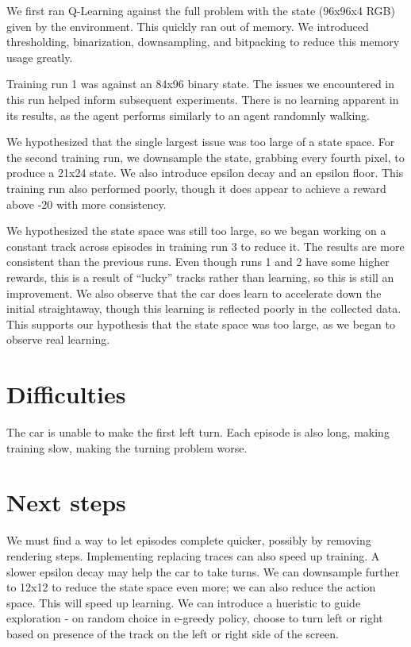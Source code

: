 \documentclass{article}
\begin{document}
We first ran Q-Learning against the full problem with the state (96x96x4
RGB) given by the environment. This quickly ran out of memory. We
introduced thresholding, binarization, downsampling, and bitpacking to
reduce this memory usage greatly.

Training run 1 was against an 84x96 binary state. The issues we
encountered in this run helped inform subsequent experiments. There is
no learning apparent in its results, as the agent performs similarly to
an agent randomnly walking.

We hypothesized that the single largest issue was too large of a state
space. For the second training run, we downsample the state, grabbing
every fourth pixel, to produce a 21x24 state. We also introduce epsilon
decay and an epsilon floor. This training run also performed poorly,
though it does appear to achieve a reward above -20 with more
consistency.

We hypothesized the state space was still too large, so we began working
on a constant track across episodes in training run 3 to reduce it. The
results are more consistent than the previous runs. Even though runs 1
and 2 have some higher rewards, this is a result of ``lucky'' tracks
rather than learning, so this is still an improvement. We also observe
that the car does learn to accelerate down the initial straightaway,
though this learning is reflected poorly in the collected data. This
supports our hypothesis that the state space was too large, as we began
to observe real learning.

\section{Difficulties}

The car is unable to make the first left turn. Each episode is also
long, making training slow, making the turning problem worse.

\section{Next steps}

We must find a way to let episodes complete quicker, possibly by removing rendering steps. 
Implementing replacing traces can also speed up training. 
A slower epsilon decay may help the car to take turns.
We can downsample further to 12x12 to reduce the state space even more; we can also reduce the action space.
This will speed up learning.
We can introduce a hueristic to guide exploration - on random choice in e-greedy policy, choose to turn left or right based on presence of the track on the left or right side of the screen.
\end{document}
